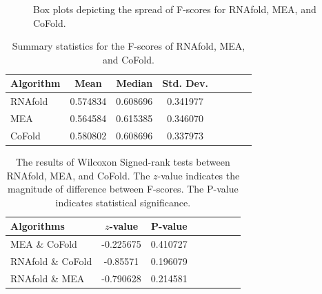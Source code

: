 \documentclass[12pt, a4paper]{article}
\begin{document}
\begin{figure}
\begin{center}
\end{center}
\caption{Box plots depicting the spread of F-scores for RNAfold, MEA, and CoFold.}
\label{fig:boxplots}
\end{figure}


\begin{table}
\centering
\begin{tabular}{l*{6}{c}r}
Algorithm	& Mean & Median & Std. Dev. \\
\hline
RNAfold &  0.574834    &    0.608696 & 0.341977   \\
MEA & 0.564584    &    0.615385  & 0.346070\\
CoFold & 0.580802  &     0.608696 & 0.337973  \\
\end{tabular}
\caption{Summary statistics for the F-scores of RNAfold, MEA, and CoFold.}
\label{tab:summarystats}
\end{table}


\begin{table}
\centering
\begin{tabular}{l*{6}{c}r}
Algorithms	& $z$-value & P-value \\
\hline 
MEA \& CoFold &  -0.225675    &    0.410727   \\
RNAfold \& CoFold &  -0.85571    &    0.196079  \\
RNAfold \& MEA &  -0.790628    &    0.214581  \\
\end{tabular}
\caption{The results of Wilcoxon Signed-rank tests between RNAfold, MEA, and CoFold. The $z$-value indicates the magnitude of difference between F-scores. The P-value indicates statistical significance.}
\label{tab:wilcoxon}
\end{table}
\end{document}
